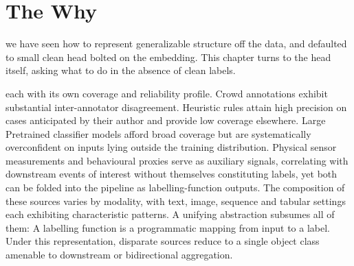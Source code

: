 \section{The Why}


 we have seen how to represent generalizable structure off the data, and defaulted 
to small clean head bolted on the embedding.
This chapter turns to the head itself, asking what to do in the absence of clean labels.


 each with its own coverage and reliability profile.
Crowd annotations exhibit substantial inter-annotator disagreement.
Heuristic rules attain high precision on cases anticipated by their author
and provide low coverage elsewhere. Large Pretrained classifier models afford broad coverage
but are systematically overconfident on inputs lying outside the training distribution.
Physical sensor measurements and behavioural proxies serve as auxiliary signals,
correlating with downstream events of interest without themselves constituting labels,
yet both can be folded into the pipeline as labelling-function outputs.
The composition of these sources varies by modality,
with text, image, sequence and tabular settings each exhibiting characteristic patterns.
A unifying abstraction subsumes all of them:
A labelling function is a programmatic mapping from input to a label.
Under this representation,
disparate sources reduce to a single object class amenable to downstream or bidirectional aggregation.

